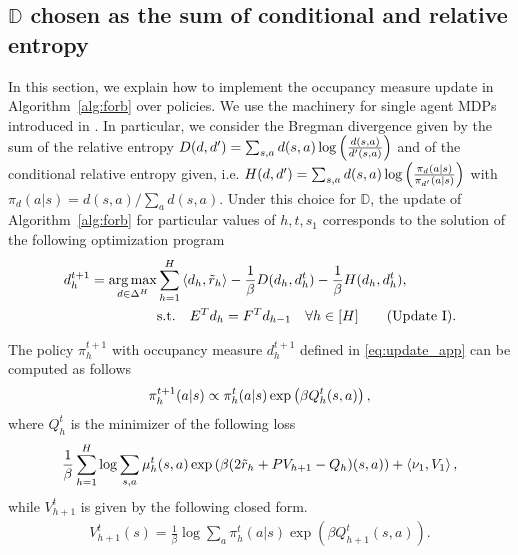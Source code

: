 \subsection{$\mathbb{D}$ chosen as the sum of conditional and relative entropy}
In this section, we explain how to implement the occupancy measure update in Algorithm~\ref{alg:forb} over policies. We use the machinery for single agent MDPs introduced in \cite{bas2021logistic}.
In particular, we consider the Bregman divergence given by the sum of the relative entropy $D(d,d') = \sum_{s,a}d(s,a) \log \left({\frac{d(s,a)}{d'(s,a)}}\right)$ and of the conditional relative entropy given, i.e. $H(d,d') = \sum_{s,a}d(s,a) \log \left({\frac{\pi_d(a|s)}{\pi_{d'}(a|s)}}\right)$ with $\pi_d(a|s) = d(s,a)/\sum_{a}d(s,a)$. Under this choice for $\mathbb{D}$, the update of Algorithm~\ref{alg:forb} for particular values of $h,t,s_1$ corresponds to the solution of the following optimization program
\begin{align}
d^{t+1}_h = \argmax_{d\in\Delta^H} &\sum^H_{h=1}\innerprod{d_h}{\tilde{r}_h} - \frac{1}{\beta} D(d_h,d_h^t) - \frac{1}{\beta} H(d_h,d_h^t), \nonumber \\
&\text{s.t.} \quad E^T d_h = F^T d_{h-1} \quad \forall h \in [H] \label{eq:update_app} \tag{\textcolor{black}{Update I}}.
\end{align}
\begin{theorem} \label{thm:updateV}
    The policy $\pi^{t+1}_h$ with occupancy measure $d^{t+1}_{h}$ defined in \cref{eq:update_app} can be computed as follows 
    \begin{align*}
        \pi^{t+1}_h(a|s) \propto \pi^t_h(a|s) \exp\left({\beta Q^t_{h}(s,a)}\right),
    \end{align*}
    where $Q^t_{h}$ is the minimizer of the following loss
    \begin{align*}\frac{1}{\beta}\sum^H_{h=1} \log \sum_{s,a} \mu_h^t(s,a) \exp\left({\beta(2 \tilde{r}_h + PV_{h+1} - Q_h)(s,a)}\right) + \left\langle{\nu_1},{V_1}\right\rangle,
    \end{align*}
    while $V^t_{h+1}$ is given by the following closed form.
    \begin{align*}
        V^t_{h+1}(s) = \frac{1}{\beta}\log \sum_a \pi^t_h(a|s) \exp(\beta Q^t_{h+1}(s,a)).
    \end{align*}
\end{theorem}

